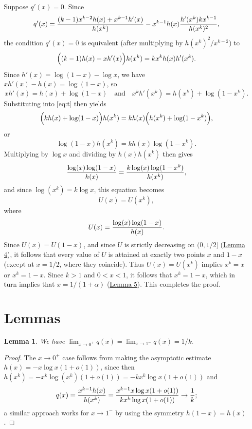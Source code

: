 \documentclass[twoside]{amsart} %
\newtheorem{lemma}{Lemma}
\begin{document}
Suppose $q'(x)=0$. 
Since
\begin{equation}
q'(x)={(k-1)x^{k-2}h(x)+x^{k-1}h'(x)\over h(x^k)}-x^{k-1}h(x){h'(x^k)kx^{k-1}\over h(x^k)^2},
\end{equation}
the condition $q'(x)=0$ is equivalent (after multiplying by $h(x^k)^2/x^{k-2}$) to
\begin{equation} \label{eq:t}
\Bigl((k-1)h(x)+xh'(x)\Bigr)h(x^k)=kx^kh(x)h'(x^k).
\end{equation}
Since $h'(x)=\log(1-x)-\log x$, we have $xh'(x)-h(x)=\log(1-x)$,
so 
\begin{equation}
xh'(x)=h(x)+\log(1-x)\quad\text{and}\quad x^kh'(x^k)=h(x^k)+\log(1-x^k).
\end{equation}
Substituting into \eqref{eq:t} then yields
\begin{equation}
\Bigl(kh(x)+\log(1-x)\Bigr)h(x^k)=kh(x)\Bigl(h(x^k)+\log(1-x^k)\Bigr),
\end{equation}
or
\begin{equation}
\log(1-x)h(x^k)=kh(x)\log(1-x^k).
\end{equation}
Multiplying by $\log x$ and dividing by $h(x)h(x^k)$ then gives
\begin{equation}
{\log(x)\log(1-x)\over h(x)}={k\log(x)\log(1-x^k)\over h(x^k)},
\end{equation}
and since $\log(x^k)=k\log x$, this equation becomes 
\begin{equation} \label{eq:main}
U(x)=U(x^k),
\end{equation}
where
\begin{equation}
U(x)={\log(x)\log(1-x)\over h(x)}.
\end{equation} 
Since $U(x)=U(1-x)$, and
since $U$ is strictly decreasing on $(0,1/2]$ (\hyperref[lemma:l4]{Lemma 4}),
it follows that every value of $U$ is attained at exactly
two points $x$ and $1-x$ (except at $x=1/2$, where they coincide).
Thus $U(x)=U(x^k)$ implies $x^k=x$ or $x^k=1-x$. Since $k>1$
and $0<x<1$, it follows that $x^k=1-x$, which in turn implies
that $x=1/(1+\alpha)$ (\hyperref[lemma:l5]{Lemma 5}). This completes the proof.

\section{Lemmas}
\begin{lemma} \label{lemma:l1}
We have $\lim_{x\to 0^+}q(x)=\lim_{x\to1^-}q(x)=1/k$.
\end{lemma}

\begin{proof}
The $x\to0^+$ case follows from making the asymptotic estimate
$h(x)=-x\log x(1+o(1))$, since then
$h(x^k)=-x^k\log(x^k)(1+o(1))=-kx^k\log x(1+o(1))$ and
\begin{equation}
q(x)={x^{k-1}h(x)\over h(x^k)}={x^{k-1}x\log x(1+o(1))\over kx^k\log x(1+o(1))}\to{1\over k};
\end{equation}
a similar approach works for $x\to1^-$ by using the symmetry $h(1-x)=h(x)$.
\end{proof}
\end{document}
